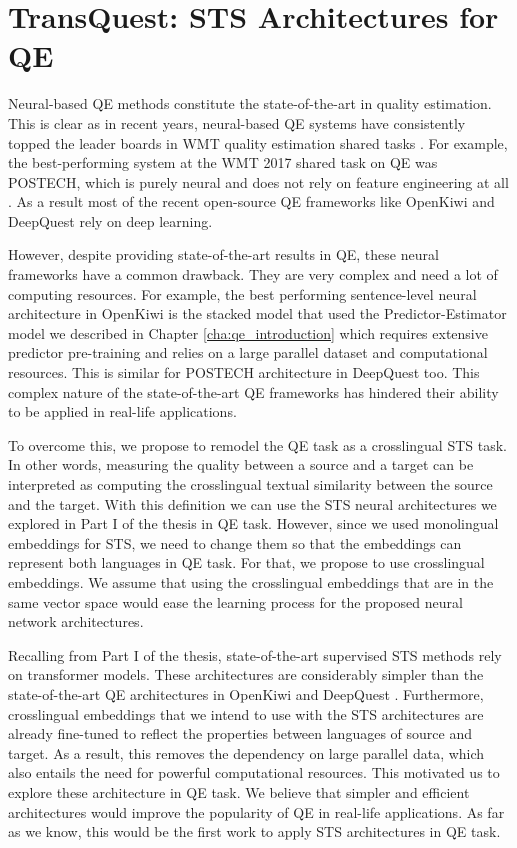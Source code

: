 \chapter{\label{cha:qe_transquest}TransQuest: STS Architectures for QE}

Neural-based QE methods constitute the state-of-the-art in quality estimation. This is clear as in recent years, neural-based QE systems have consistently topped the leader boards in WMT quality estimation shared tasks  \cite{kepler-etal-2019-openkiwi}. For example, the best-performing system at the WMT 2017 shared task on QE was \textsc{POSTECH}, which is purely neural and does not rely on feature engineering at all \cite{kim-etal-2017-predictor}. As a result most of the recent open-source QE frameworks like OpenKiwi \cite{kepler-etal-2019-openkiwi} and DeepQuest  \cite{ive-etal-2018-deepquest} rely on deep learning. 

However, despite providing state-of-the-art results in QE, these neural frameworks have a common drawback. They are very complex and need a lot of computing resources. For example, the best performing sentence-level neural architecture in OpenKiwi \cite{kepler-etal-2019-openkiwi} is the stacked model that used the Predictor-Estimator model we described in Chapter \ref{cha:qe_introduction} which requires extensive predictor pre-training and relies on a large parallel dataset and computational resources. This is similar for \textsc{POSTECH} architecture in DeepQuest \cite{ive-etal-2018-deepquest} too. This complex nature of the state-of-the-art QE frameworks has hindered their ability to be applied in real-life applications. 

To overcome this, we propose to remodel the QE task as a crosslingual STS task. In other words, measuring the quality between a source and a target can be interpreted as computing the crosslingual textual similarity between the source and the target. With this definition we can use the STS neural architectures we explored in Part I of the thesis in QE task. However, since we used monolingual embeddings for STS, we need to change them so that the embeddings can represent both languages in QE task. For that, we propose to use crosslingual embeddings. We assume that using the crosslingual embeddings that are in the same vector space would ease the learning process for the proposed neural network architectures. 

Recalling from Part I of the thesis, state-of-the-art supervised STS methods rely on transformer models. These architectures are considerably simpler than the state-of-the-art QE architectures in OpenKiwi \cite{kepler-etal-2019-openkiwi} and DeepQuest  \cite{ive-etal-2018-deepquest}. Furthermore, crosslingual embeddings that we intend to use with the STS architectures are already fine-tuned to reflect the properties between languages of source and target. As a result, this removes the dependency on large parallel data, which also entails the need for powerful computational resources. This motivated us to explore these architecture in QE task. We believe that simpler and efficient architectures would improve the popularity of QE in real-life applications. As far as we know, this would be the first work to apply STS architectures in QE task.

